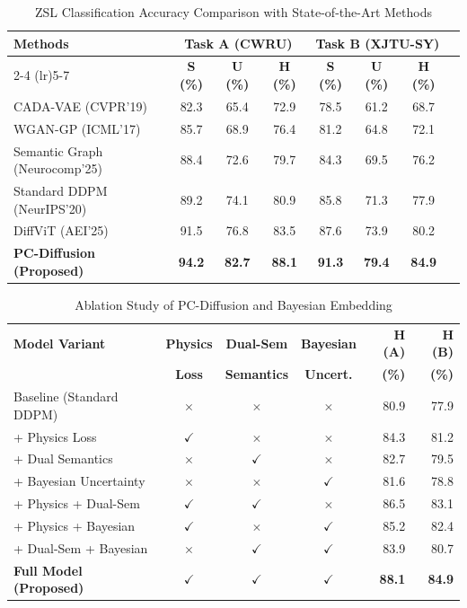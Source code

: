 \documentclass[journal]{IEEEtran}
\begin{document}
\begin{table}[t]
\centering
\caption{ZSL Classification Accuracy Comparison with State-of-the-Art Methods}
\label{tab:performance}
\begin{tabular}{lccccccc}
\toprule
\multirow{2}{*}{\textbf{Methods}} & \multicolumn{3}{c}{\textbf{Task A (CWRU)}} & \multicolumn{3}{c}{\textbf{Task B (XJTU-SY)}} \\
\cmidrule(lr){2-4} \cmidrule(lr){5-7}
& \textbf{S (\%)} & \textbf{U (\%)} & \textbf{H (\%)} & \textbf{S (\%)} & \textbf{U (\%)} & \textbf{H (\%)} \\
\midrule
CADA-VAE (CVPR'19) & 82.3 & 65.4 & 72.9 & 78.5 & 61.2 & 68.7 \\
WGAN-GP (ICML'17) & 85.7 & 68.9 & 76.4 & 81.2 & 64.8 & 72.1 \\
Semantic Graph (Neurocomp'25) & 88.4 & 72.6 & 79.7 & 84.3 & 69.5 & 76.2 \\
Standard DDPM (NeurIPS'20) & 89.2 & 74.1 & 80.9 & 85.8 & 71.3 & 77.9 \\
DiffViT (AEI'25) & 91.5 & 76.8 & 83.5 & 87.6 & 73.9 & 80.2 \\
\midrule
\textbf{PC-Diffusion (Proposed)} & \textbf{94.2} & \textbf{82.7} & \textbf{88.1} & \textbf{91.3} & \textbf{79.4} & \textbf{84.9} \\
\bottomrule
\end{tabular}
\end{table}

\begin{table}[!t]
\centering
\caption{Ablation Study of PC-Diffusion and Bayesian Embedding}
\label{tab:ablation}
\begin{tabular}{lcccrr}
\toprule
\textbf{Model Variant} & \textbf{Physics} & \textbf{Dual-Sem} & \textbf{Bayesian} & \textbf{H (A)} & \textbf{H (B)} \\
                       & \textbf{Loss} & \textbf{Semantics} & \textbf{Uncert.} & \textbf{(\%)} & \textbf{(\%)} \\
\midrule
Baseline (Standard DDPM) & $\times$ & $\times$ & $\times$ & 80.9 & 77.9 \\
+ Physics Loss & $\checkmark$ & $\times$ & $\times$ & 84.3 & 81.2 \\
+ Dual Semantics & $\times$ & $\checkmark$ & $\times$ & 82.7 & 79.5 \\
+ Bayesian Uncertainty & $\times$ & $\times$ & $\checkmark$ & 81.6 & 78.8 \\
+ Physics + Dual-Sem & $\checkmark$ & $\checkmark$ & $\times$ & 86.5 & 83.1 \\
+ Physics + Bayesian & $\checkmark$ & $\times$ & $\checkmark$ & 85.2 & 82.4 \\
+ Dual-Sem + Bayesian & $\times$ & $\checkmark$ & $\checkmark$ & 83.9 & 80.7 \\
\midrule
\textbf{Full Model (Proposed)} & $\checkmark$ & $\checkmark$ & $\checkmark$ & \textbf{88.1} & \textbf{84.9} \\
\bottomrule
\end{tabular}
\end{table}
\end{document}
